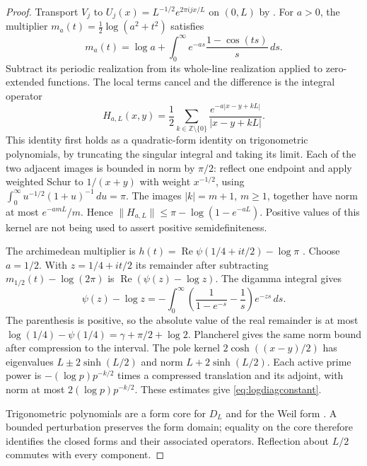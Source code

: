 \begin{proof}
Transport $V_j$ to $U_j(x)=L^{-1/2}e^{2\pi ijx/L}$ on $(0,L)$ by
\cite[Prop.~3.2]{CCM2025}. For $a>0$, the multiplier
$m_a(t)=\tfrac12\log(a^2+t^2)$ satisfies
\[
 m_a(t)=\log a+\int_0^\infty e^{-as}\frac{1-\cos(ts)}s\,ds.
\]
Subtract its periodic realization from its whole-line realization applied to
zero-extended functions. The local terms cancel and the difference is the
integral operator
\[
 H_{a,L}(x,y)=\frac12\sum_{k\in\mathbb Z\setminus\{0\}}
       \frac{e^{-a|x-y+kL|}}{|x-y+kL|}.
\]
This identity first holds as a quadratic-form identity on trigonometric
polynomials, by truncating the singular integral and taking its limit.
Each of the two adjacent images is bounded in norm by $\pi/2$: reflect one
endpoint and apply weighted Schur to $1/(x+y)$ with weight $x^{-1/2}$,
using $\int_0^\infty u^{-1/2}(1+u)^{-1}\,du=\pi$.
The images $|k|=m+1$, $m\ge1$, together have norm at most $e^{-amL}/m$.
Hence $\|H_{a,L}\|\le\pi-\log(1-e^{-aL})$. Positive values of this kernel
are not being used to assert positive semidefiniteness.

The archimedean multiplier is
$h(t)=\operatorname{Re}\psi(1/4+it/2)-\log\pi$
\cite[eq.~(3.19)]{CCM2025}. Choose $a=1/2$. With $z=1/4+it/2$ its remainder
after subtracting $m_{1/2}(t)-\log(2\pi)$ is
$\operatorname{Re}(\psi(z)-\log z)$. The digamma integral
\cite[eq.~5.9.13]{DLMF} gives
\[
 \psi(z)-\log z=-\int_0^\infty
   \left(\frac1{1-e^{-s}}-\frac1s\right)e^{-zs}\,ds.
\]
The parenthesis is positive, so the absolute value of the real remainder
is at most $\log(1/4)-\psi(1/4)=\gamma+\pi/2+\log2$.
Plancherel gives the same norm bound after compression to the interval.
The pole kernel $2\cosh((x-y)/2)$ has eigenvalues
$L\pm2\sinh(L/2)$ and norm $L+2\sinh(L/2)$. Each active prime power is
$-(\log p)p^{-k/2}$ times a compressed translation and its adjoint, with
norm at most $2(\log p)p^{-k/2}$. These estimates give
\eqref{eq:logdiagconstant}.

Trigonometric polynomials are a form core for $D_L$ and for the Weil form
\cite[Prop.~3.4]{CCM2025}. A bounded perturbation preserves the form domain;
equality on the core therefore identifies the closed forms and their
associated operators. Reflection about $L/2$ commutes with every component.
\end{proof}

